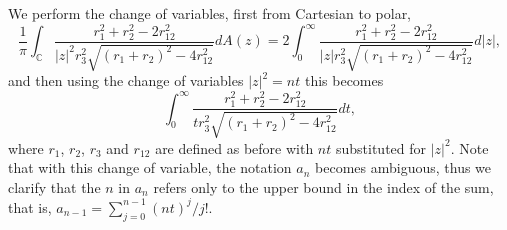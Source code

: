 \documentclass[12pt]{amsart}
\theoremstyle{remark}
\begin{document}
We perform the change of variables, first from Cartesian to polar,
\begin{equation*}
\frac{1}{\pi}\int_{\mathbb{C}}\frac{r_1^2+r_2^2-2r_{12}^2}{\lvert z\rvert^2r_3^2\sqrt{(r_1+r_2)^2-4r_{12}^2}}dA(z)=2\int_0^\infty\frac{r_1^2+r_2^2-2r_{12}^2}{\lvert z\rvert r_3^2\sqrt{(r_1+r_2)^2-4r_{12}^2}}d\lvert z\rvert,
\end{equation*}
and then using the change of variables $\lvert z\rvert^2=nt$ this becomes
\begin{equation}\label{MainInt}
\int_0^\infty\frac{r_1^2+r_2^2-2r_{12}^2}{t r_3^2\sqrt{(r_1+r_2)^2-4r_{12}^2}}dt,
\end{equation}
where $r_1$, $r_2$, $r_3$ and $r_{12}$ are defined as before with $nt$ substituted for $\lvert z\rvert^2$.  Note that with this change of variable, the notation $a_n$ becomes ambiguous, thus we clarify that the $n$ in $a_n$ refers only to the upper bound in the index of the sum, that is, $a_{n-1}=\sum_{j=0}^{n-1}(nt)^j/j!$.
\end{document}
